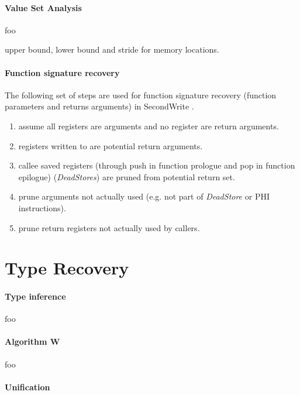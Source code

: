 \documentclass[10pt, a4paper, sigplan, authordraft]{acmart}
\begin{document}
\paragraph{Value Set Analysis}

foo

upper bound, lower bound and stride for memory locations.

\paragraph{Function signature recovery}

The following set of steps are used for function signature recovery (function parameters and returns arguments) in SecondWrite \cite{scalable_type_detection}.

\begin{enumerate}
	\item assume all registers are arguments and no register are return arguments.
	\item registers written to are potential return arguments.
	\item callee saved registers (through push in function prologue and pop in function epilogue) (\textit{DeadStores}) are pruned from potential return set.
	\item prune arguments not actually used (e.g. not part of \textit{DeadStore} or PHI instructions).
	\item prune return registers not actually used by callers.
\end{enumerate}

\section{Type Recovery}

\paragraph{Type inference}

foo

\paragraph{Algorithm W}

foo

\paragraph{Unification}
\end{document}
